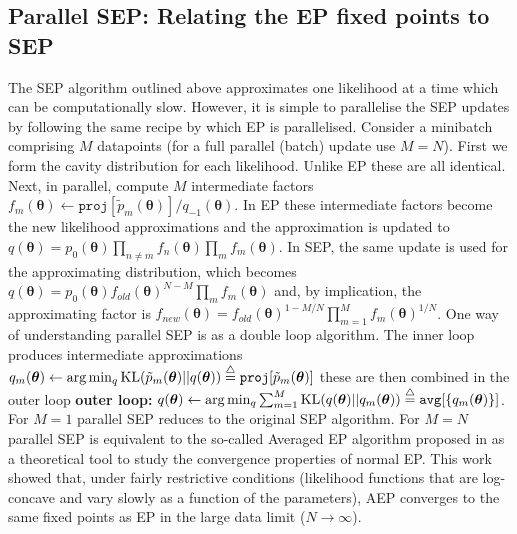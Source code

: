 \subsection{Parallel SEP: Relating the EP fixed points to SEP}
%
The SEP algorithm outlined above approximates one likelihood at a time which can be computationally slow. However, it is simple to parallelise the SEP updates by following the same recipe by which EP is parallelised. Consider a minibatch comprising $M$ datapoints (for a full parallel (batch) update use $M=N$). First we form the cavity distribution for each likelihood. Unlike EP these are all identical. Next, in parallel, compute $M$ intermediate factors $f_m(\bm{\theta}) \leftarrow \mathtt{proj}[\tilde{p}_m(\bm{\theta})] / q_{-1}(\bm{\theta})$. In EP these intermediate factors become the new likelihood approximations and the approximation is updated to $q(\bm{\theta}) = p_0(\bm{\theta}) \prod_{n \ne m} f_n(\bm{\theta}) \prod_{m} f_m(\bm{\theta}) $. In SEP, the same update is used for the approximating distribution, which becomes $q(\bm{\theta}) = p_0(\bm{\theta}) f_{old}(\bm{\theta})^{N-M} \prod_{m} f_m(\bm{\theta}) $ and, by implication, the approximating factor is $f_{new}(\bm{\theta}) = f_{old}(\bm{\theta})^{1-M/N} \prod_{m=1}^M f_m(\bm{\theta})^{1/N}$. One way of understanding parallel SEP is as a double loop algorithm. The inner loop produces intermediate approximations  $q_m(\bm{\theta}) \leftarrow \arg\min_q \mathrm{KL}(\tilde{p}_m(\bm{\theta}) ||q(\bm{\theta})) \buildrel\triangle\over = \mathtt{proj}[\tilde{p}_m(\bm{\theta})]$ these are then combined in the outer loop \textbf{outer loop:} $q(\bm{\theta}) \leftarrow \arg\min_q \sum_{m=1}^M \mathrm{KL}(q(\bm{\theta}) ||q_m(\bm{\theta})) \buildrel\triangle\over = \mathtt{avg}[\{q_m(\bm{\theta})\}]$.
%
%
For $M=1$ parallel SEP reduces to the original SEP algorithm. For $M=N$ parallel SEP is equivalent to the so-called Averaged EP algorithm proposed in \cite{barthelme:aep} as a theoretical tool to study the convergence properties of normal EP. This work showed that, under fairly restrictive conditions (likelihood functions that are log-concave and vary slowly as a function of the parameters), AEP converges to the same fixed points as EP in the large data limit ($N \rightarrow \infty$).

